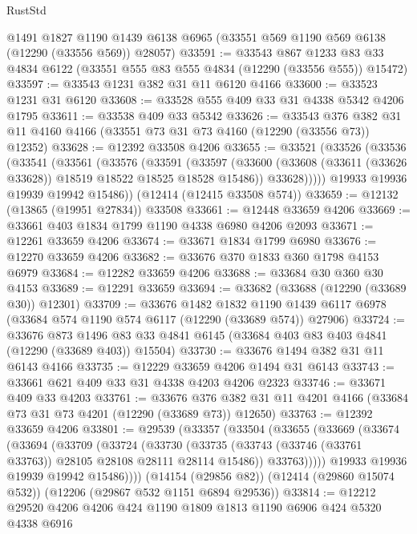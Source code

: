 \begin{lexlean}{RustStd}
\begin{coremodule}
{\begin{coremodule}
{{{{{{{{{{{{{{{{{{{{{{{{{{{{{{{{{{{{{{{{{{{{{{{{{{    @1491
    @1827
    @1190
    @1439
    @6138
    @6965
    (@33551 @569 @1190 @569 @6138 (@12290 (@33556 @569)) @28057)
@33591 := @33543
    @867
    @1233
    @83
    @33
    @4834
    @6122
    (@33551 @555 @83 @555 @4834 (@12290 (@33556 @555)) @15472)
@33597 := @33543 @1231 @382 @31 @11 @6120 @4166
@33600 := @33523 @1231 @31 @6120
@33608 := @33528 @555 @409 @33 @31 @4338 @5342 @4206 @1795
@33611 := @33538 @409 @33 @5342
@33626 := @33543
    @376
    @382
    @31
    @11
    @4160
    @4166
    (@33551 @73 @31 @73 @4160 (@12290 (@33556 @73)) @12352)
@33628 := @12392 @33508 @4206
@33655 := @33521
    (@33526
      (@33536
        (@33541
          (@33561
            (@33576
              (@33591
                (@33597
                  (@33600 (@33608 (@33611 (@33626 @33628)) @18519 @18522 @18525 @18528 @15486))
                  @33628)))))
        @19933
        @19936
        @19939
        @19942
        @15486))
    (@12414 (@12415 @33508 @574))
@33659 := @12132 (@13865 (@19951 @27834)) @33508
@33661 := @12448 @33659 @4206
@33669 := @33661 @403 @1834 @1799 @1190 @4338 @6980 @4206 @2093
@33671 := @12261 @33659 @4206
@33674 := @33671 @1834 @1799 @6980
@33676 := @12270 @33659 @4206
@33682 := @33676 @370 @1833 @360 @1798 @4153 @6979
@33684 := @12282 @33659 @4206
@33688 := @33684 @30 @360 @30 @4153
@33689 := @12291 @33659
@33694 := @33682 (@33688 (@12290 (@33689 @30)) @12301)
@33709 := @33676
    @1482
    @1832
    @1190
    @1439
    @6117
    @6978
    (@33684 @574 @1190 @574 @6117 (@12290 (@33689 @574)) @27906)
@33724 := @33676
    @873
    @1496
    @83
    @33
    @4841
    @6145
    (@33684 @403 @83 @403 @4841 (@12290 (@33689 @403)) @15504)
@33730 := @33676 @1494 @382 @31 @11 @6143 @4166
@33735 := @12229 @33659 @4206 @1494 @31 @6143
@33743 := @33661 @621 @409 @33 @31 @4338 @4203 @4206 @2323
@33746 := @33671 @409 @33 @4203
@33761 := @33676
    @376
    @382
    @31
    @11
    @4201
    @4166
    (@33684 @73 @31 @73 @4201 (@12290 (@33689 @73)) @12650)
@33763 := @12392 @33659 @4206
@33801 := @29539
    (@33357
      (@33504
        (@33655
          (@33669
            (@33674
              (@33694
                (@33709
                  (@33724
                    (@33730
                      (@33735 (@33743 (@33746 (@33761 @33763)) @28105 @28108 @28111 @28114 @15486))
                      @33763)))))
            @19933
            @19936
            @19939
            @19942
            @15486))))
    (@14154 (@29856 @82))
    (@12414 (@29860 @15074 @532))
    (@12206 (@29867 @532 @1151 @6894 @29536))
@33814 := @12212 @29520 @4206 @4206 @424 @1190 @1809 @1813 @1190 @6906 @424 @5320 @4338 @6916
}}}}}}}}}}}}}}}}}}}}}}}}}}}}}}}}}}}}}}}}}}}}}}}}}}
\end{coremodule}}
\end{coremodule}
\end{lexlean}
